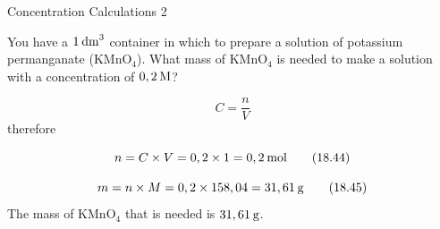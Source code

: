     \noindent
\par
            \label{m38712*secfhsst!!!underscore!!!id1722}\vspace{.5cm} 

      \begin{wex}{Concentration Calculations 2 }
{
\label{m38712*probfhsst!!!underscore!!!id1723}
      \label{m38712*id283214}You have a $1\phantom{\rule{2pt}{0ex}}{\mathrm{dm}}^{3}$ container in which to prepare a solution of potassium permanganate ($\mathrm{KMnO}{}_{4}$). What mass of $\mathrm{KMnO}{}_{4}$ is needed to make a solution with a concentration of $0,2\phantom{\rule{2pt}{0ex}}\mathrm{M}$?\par 
      \vspace{5pt}}
{
      \label{m38712*id283297}\nopagebreak\noindent{}
        
    \begin{equation}
    C=\frac{n}{V}\tag{18.43}
      \end{equation}
      \label{m38712*id283318}therefore\par 
      \label{m38712*id283321}\nopagebreak\noindent{}
        
    \begin{equation}
    n=C\ensuremath{\times}V=0,2\ensuremath{\times}1=0,2\phantom{\rule{2pt}{0ex}}\mathrm{mol}\tag{18.44}
      \end{equation}
      \label{m38712*id283387}\nopagebreak\noindent{}
        
    \begin{equation}
    m=n\ensuremath{\times}M=0,2\ensuremath{\times}158,04=31,61\phantom{\rule{2pt}{0ex}}\mathrm{g}\tag{18.45}
      \end{equation}
      \label{m38712*id283435}The mass of $\mathrm{KMnO}{}_{4}$ that is needed is $31,61\phantom{\rule{2pt}{0ex}}\mathrm{g}$.
 \par 
}
    \end{wex}
    \noindent
\label{m38712*secfhsst!!!underscore!!!id1795}\vspace{.5cm} 

